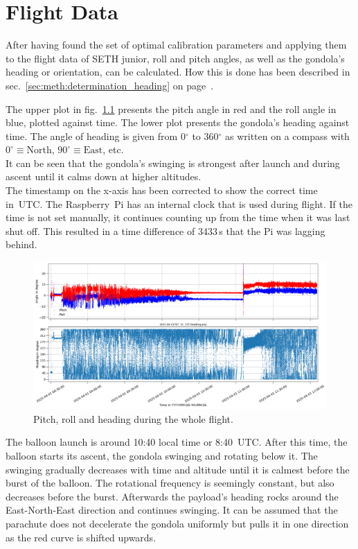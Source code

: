 \chapter{Flight Data \label{ch:flight_data}}
After having found the set of optimal calibration parameters and applying them to the flight data of \ac{SETH} junior, roll and pitch angles, as well as the gondola's heading or orientation, can be calculated. How this is done has been described in sec.~\ref{sec:meth:determination_heading} on page~\pageref{sec:meth:determination_heading}.

The upper plot in fig.~\ref{fig:res:flight_heading} presents the pitch angle in red and the roll angle in blue, plotted against time. The lower plot presents the gondola's heading against time. The angle of heading is given from 0$^\circ$ to 360$^\circ$ as written on a compass with $0^\circ\equiv\mathrm{North}$, $90^\circ\equiv\mathrm{East}$, etc.\\
It can be seen that the gondola's swinging is strongest after launch and during ascent until it calms down at higher altitudes.\\
The timestamp on the x-axis has been corrected to show the correct time in~UTC. The Raspberry~Pi has an internal clock that is used during flight. If the time is not set manually, it continues counting up from the time when it was last shut off. This resulted in a time difference of 3433\,s that the Pi was lagging behind.

\begin{figure}[H]
    \centering
    \includegraphics[width=\linewidth]{images/05_flight_data/flight_heading.png}
    \caption{Pitch, roll and heading during the whole flight.}
    \label{fig:res:flight_heading}
\end{figure}

The balloon launch is around 10:40 local time or 8:40~UTC. After this time, the balloon starts its ascent, the gondola swinging and rotating below it. The swinging gradually decreases with time and altitude until it is calmest before the burst of the balloon. The rotational frequency is seemingly constant, but also decreases before the burst. Afterwards the payload's heading rocks around the East-North-East direction and continues swinging. It can be assumed that the parachute does not decelerate the gondola uniformly but pulls it in one direction as the red curve is shifted upwards.

